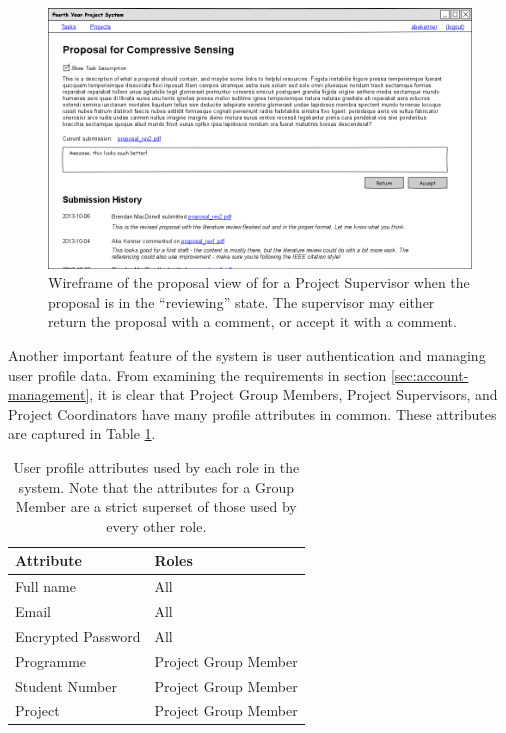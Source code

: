 \begin{figure}[!htbp]
\centering \includegraphics[width=6in]{./img/case-study-fourth-year-system/supervisor-proposal-view_wireframe}
\caption{Wireframe of the proposal view of for a Project Supervisor when the proposal is in the ``reviewing'' state. The supervisor may either return the proposal with a comment, or accept it with a comment.}
\label{fig:wireframe-supervisor-proposal-view}
\end{figure}

Another important feature of the system is user authentication and managing user profile data. From examining the requirements in section \ref{sec:account-management}, it is clear that Project Group Members, Project Supervisors, and Project Coordinators have many profile attributes in common. These attributes are captured in Table \ref{tbl:user-profile-attributes}.

\begin{table}
  \centering
  \caption{User profile attributes used by each role in the system. Note that the attributes for a Group Member are a strict superset of those used by every other role.}
  \label{tbl:user-profile-attributes}
  \tablespacer
  \begin{tabular}{ l l }
    \toprule
    Attribute & Roles \\
    \midrule
    Full name & All \\
    Email & All \\
    Encrypted Password & All \\
    Programme & Project Group Member \\
    Student Number & Project Group Member \\
    Project & Project Group Member \\
    \bottomrule
  \end{tabular}
\end{table}

